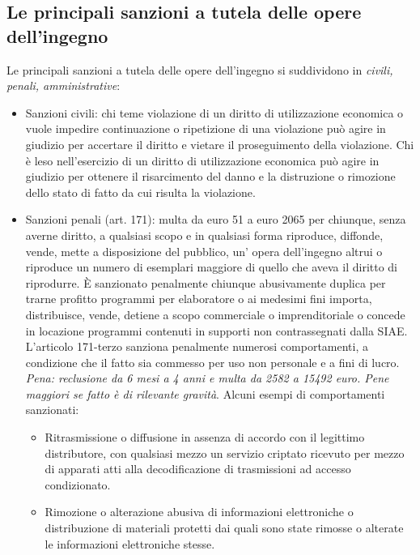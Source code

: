 \subsection{Le principali sanzioni a tutela delle opere dell'ingegno}
Le principali sanzioni a tutela delle opere dell'ingegno si suddividono in \emph{civili, penali, amministrative}:
\begin{itemize}
    \item Sanzioni civili: chi teme violazione di un diritto di utilizzazione economica o vuole impedire
    continuazione o ripetizione di una violazione può agire in giudizio per accertare il diritto e vietare
    il proseguimento della violazione. \newline
    Chi è leso nell'esercizio di un diritto di utilizzazione economica può agire in giudizio per ottenere il risarcimento
    del danno e la distruzione o rimozione dello stato di fatto da cui risulta la violazione.
    \item Sanzioni penali (art. 171): multa da euro 51 a euro 2065 per chiunque, senza averne diritto, a qualsiasi
    scopo e in qualsiasi forma riproduce, diffonde, vende, mette a disposizione del pubblico, un' opera dell'ingegno
    altrui o riproduce un numero di esemplari maggiore di quello che aveva il diritto di riprodurre.\newline
    È sanzionato penalmente chiunque abusivamente duplica per trarne profitto programmi per elaboratore o ai medesimi fini
    importa, distribuisce, vende, detiene a scopo commerciale o imprenditoriale o concede in locazione programmi contenuti
    in supporti non contrassegnati dalla SIAE.
    L'articolo 171-terzo sanziona penalmente numerosi comportamenti, a condizione che il fatto sia commesso per
    uso non personale e a fini di lucro.  \emph{Pena: reclusione da 6 mesi a 4 anni e multa da 2582 a 15492 euro. Pene
    maggiori se fatto è di rilevante gravità}.\newline
    Alcuni esempi di comportamenti sanzionati:
    \begin{itemize}
        \item Ritrasmissione o diffusione in assenza di accordo con il legittimo distributore, con qualsiasi mezzo
        un servizio criptato ricevuto per mezzo di apparati atti alla decodificazione di trasmissioni ad accesso condizionato.
        \item Rimozione o alterazione abusiva di informazioni elettroniche o distribuzione di materiali protetti dai quali sono
        state rimosse o alterate le informazioni elettroniche stesse.

\end{itemize}
\end{itemize}
